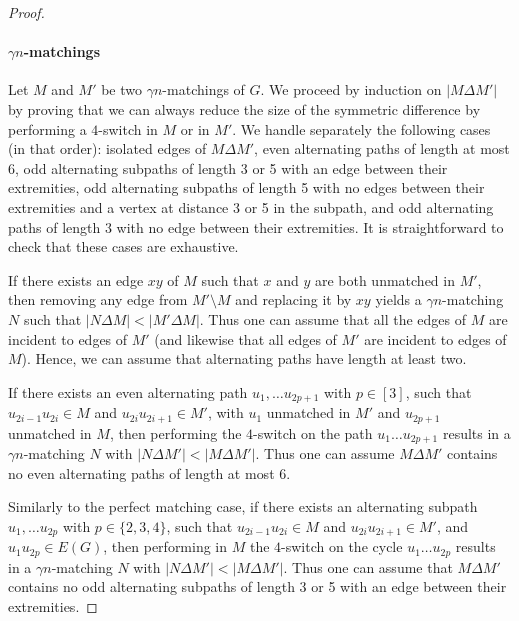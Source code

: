 \documentclass[11pt,a4paper]{article}
\theoremstyle{definition}
\begin{document}
\begin{proof}
  \paragraph{$\gamma n$-matchings}
  Let $M$ and $M'$ be two $\gamma n$-matchings of $G$. We proceed by induction
  on $|M \Delta M'|$ by proving that we can always reduce the size of the
  symmetric difference by performing a $4$-switch in $M$ or in $M'$. We handle
  separately the following cases (in that order): isolated edges of
  $M \Delta M'$, even alternating paths of length at most 6, odd alternating
  subpaths of length 3 or 5 with an edge between their extremities, odd
  alternating subpaths of length 5 with no edges between their extremities and a
  vertex at distance 3 or 5 in the subpath, and odd alternating paths of length
  3 with no edge between their extremities. It is straightforward to check that
  these cases are exhaustive.

  If there exists an edge $xy$ of $M$ such that $x$ and $y$ are both unmatched
  in $M'$, then removing any edge from $M' \setminus M$ and replacing it by $xy$
  yields a $\gamma n$-matching $N$ such that $|N\Delta M| < |M' \Delta M|$. Thus
  one can assume that all the edges of $M$ are incident to edges of $M'$ (and
  likewise that all edges of $M'$ are incident to edges of $M$). Hence, we can
  assume that alternating paths have length at least two.
  
  If there exists an even alternating path $u_1, \dots u_{2p+1}$ with
  $p \in [3]$, such that $u_{2i-1}u_{2i} \in M$ and $u_{2i}u_{2i+1} \in M'$,
  with $u_1$ unmatched in $M'$ and $u_{2p+1}$ unmatched in $M$, then performing
  the $4$-switch on the path $u_1\dots u_{2p+1}$ results in a $\gamma n$-matching $N$ with
  $|N \Delta M'| < |M\Delta M'|$. Thus one can assume $M \Delta M'$ contains no
  even alternating paths of length at most 6.

  Similarly to the perfect matching case, if there exists an alternating subpath
  $u_1, \dots u_{2p}$ with $p \in \{2,3,4\}$, such that $u_{2i-1}u_{2i} \in M$
  and $u_{2i}u_{2i+1} \in M'$, and $u_1u_{2p} \in E(G)$, then performing in $M$ the
  $4$-switch on the cycle $u_1\dots u_{2p}$ results in a $\gamma n$-matching $N$ with
  $|N \Delta M'| < |M\Delta M'|$. Thus one can assume that $M \Delta M'$
  contains no odd alternating subpaths of length 3 or 5 with an edge between
  their extremities.


\end{proof}
\end{document}
